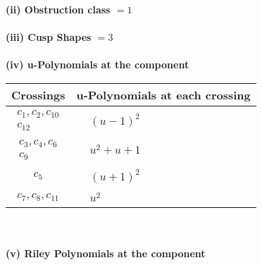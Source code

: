 \documentclass[1p]{elsarticle_modified}
\theoremstyle{definition}
\begin{document}
\flushleft \textbf{(ii) Obstruction class $= 1$}\\~\\
\flushleft \textbf{(iii) Cusp Shapes $= 3$}\\~\\
\newpage\renewcommand{\arraystretch}{1}
\flushleft \textbf{(iv) u-Polynomials at the component}\newline \\
\begin{tabular}{m{50pt}|m{274pt}}
Crossings & \hspace{64pt}u-Polynomials at each crossing \\
\hline $$\begin{aligned}c_{1},c_{2},c_{10}\\c_{12}\end{aligned}$$&$\begin{aligned}
&(u-1)^2
\end{aligned}$\\
\hline $$\begin{aligned}c_{3},c_{4},c_{6}\\c_{9}\end{aligned}$$&$\begin{aligned}
&u^2+u+1
\end{aligned}$\\
\hline $$\begin{aligned}c_{5}\end{aligned}$$&$\begin{aligned}
&(u+1)^2
\end{aligned}$\\
\hline $$\begin{aligned}c_{7},c_{8},c_{11}\end{aligned}$$&$\begin{aligned}
&u^2
\end{aligned}$\\
\hline
\end{tabular}\\~\\
\newpage\renewcommand{\arraystretch}{1}
\flushleft \textbf{(v) Riley Polynomials at the component}\newline \\
\end{document}
